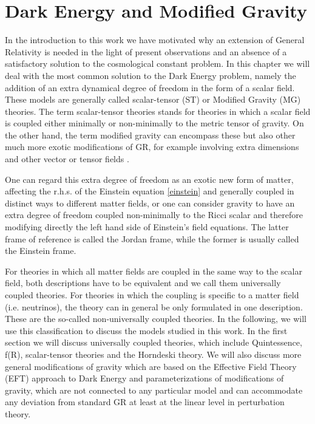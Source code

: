 \chapter{Dark Energy and Modified Gravity} %

\label{DE-MG} %




In the introduction to this work we have motivated why an extension of General Relativity
is needed in the light of present observations and an absence of a satisfactory
solution to the cosmological constant problem.
In this chapter we will deal with the most common solution to the Dark Energy problem,
namely the addition of an extra dynamical degree of freedom in the form of a scalar field.
These models are generally called scalar-tensor (ST) or Modified Gravity (MG) theories. 
The term scalar-tensor theories stands for theories in which a scalar field is coupled either minimally or non-minimally
to the metric tensor of gravity. On the other hand, the term 
modified gravity can encompass these but also other much more exotic modifications of GR, 
for example involving extra dimensions and other 
vector or tensor fields \cite{cite, bigravity, LH vector theory, dgp}. 

One can regard this extra degree of freedom as an exotic new form of matter, affecting the 
r.h.s. of the Einstein equation \ref{einstein} and generally coupled in distinct ways to different matter fields, 
or one can consider gravity to have an extra degree of freedom coupled non-minimally to the 
Ricci scalar and therefore modifying 
directly the left hand side of Einstein's field equations. The latter frame of reference
is called the Jordan frame, while the former is usually called the Einstein frame.

For theories in which all matter fields are coupled in the same way to the scalar field, both descriptions
have to be equivalent and we call them universally coupled theories. 
For theories in which the coupling is specific to a matter field (i.e. neutrinos), the theory can in general be only formulated
in one description. These are the so-called non-universally coupled theories.
In the following, we will use this classification to discuss the models studied in this work.
In the first section we will discuss universally coupled theories, which include Quintessence, f(R),
scalar-tensor theories and the Horndeski theory. We will also discuss
more general modifications of gravity which are based on the Effective Field Theory (EFT) approach to
Dark Energy and parameterizations of modifications of gravity, which
are not connected to any particular model and can accommodate any deviation from standard GR at least at the linear 
level in perturbation theory.

